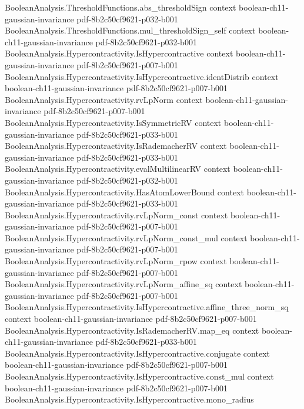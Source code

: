 \begin{theorem}
\proofstep
  {BooleanAnalysis.ThresholdFunctions.abs_thresholdSign}
  {context}
  {boolean-ch11-gaussian-invariance}
  {pdf-8b2c50cf9621-p032-b001}
\proofstep
  {BooleanAnalysis.ThresholdFunctions.mul_thresholdSign_self}
  {context}
  {boolean-ch11-gaussian-invariance}
  {pdf-8b2c50cf9621-p032-b001}
\proofstep
  {BooleanAnalysis.Hypercontractivity.IsHypercontractive}
  {context}
  {boolean-ch11-gaussian-invariance}
  {pdf-8b2c50cf9621-p007-b001}
\proofstep
  {BooleanAnalysis.Hypercontractivity.IsHypercontractive.identDistrib}
  {context}
  {boolean-ch11-gaussian-invariance}
  {pdf-8b2c50cf9621-p007-b001}
\proofstep
  {BooleanAnalysis.Hypercontractivity.rvLpNorm}
  {context}
  {boolean-ch11-gaussian-invariance}
  {pdf-8b2c50cf9621-p007-b001}
\proofstep
  {BooleanAnalysis.Hypercontractivity.IsSymmetricRV}
  {context}
  {boolean-ch11-gaussian-invariance}
  {pdf-8b2c50cf9621-p033-b001}
\proofstep
  {BooleanAnalysis.Hypercontractivity.IsRademacherRV}
  {context}
  {boolean-ch11-gaussian-invariance}
  {pdf-8b2c50cf9621-p033-b001}
\proofstep
  {BooleanAnalysis.Hypercontractivity.evalMultilinearRV}
  {context}
  {boolean-ch11-gaussian-invariance}
  {pdf-8b2c50cf9621-p032-b001}
\proofstep
  {BooleanAnalysis.Hypercontractivity.HasAtomLowerBound}
  {context}
  {boolean-ch11-gaussian-invariance}
  {pdf-8b2c50cf9621-p033-b001}
\proofstep
  {BooleanAnalysis.Hypercontractivity.rvLpNorm_const}
  {context}
  {boolean-ch11-gaussian-invariance}
  {pdf-8b2c50cf9621-p007-b001}
\proofstep
  {BooleanAnalysis.Hypercontractivity.rvLpNorm_const_mul}
  {context}
  {boolean-ch11-gaussian-invariance}
  {pdf-8b2c50cf9621-p007-b001}
\proofstep
  {BooleanAnalysis.Hypercontractivity.rvLpNorm_rpow}
  {context}
  {boolean-ch11-gaussian-invariance}
  {pdf-8b2c50cf9621-p007-b001}
\proofstep
  {BooleanAnalysis.Hypercontractivity.rvLpNorm_affine_sq}
  {context}
  {boolean-ch11-gaussian-invariance}
  {pdf-8b2c50cf9621-p007-b001}
\proofstep
  {BooleanAnalysis.Hypercontractivity.IsHypercontractive.affine_three_norm_sq}
  {context}
  {boolean-ch11-gaussian-invariance}
  {pdf-8b2c50cf9621-p007-b001}
\proofstep
  {BooleanAnalysis.Hypercontractivity.IsRademacherRV.map_eq}
  {context}
  {boolean-ch11-gaussian-invariance}
  {pdf-8b2c50cf9621-p033-b001}
\proofstep
  {BooleanAnalysis.Hypercontractivity.IsHypercontractive.conjugate}
  {context}
  {boolean-ch11-gaussian-invariance}
  {pdf-8b2c50cf9621-p007-b001}
\proofstep
  {BooleanAnalysis.Hypercontractivity.IsHypercontractive.const_mul}
  {context}
  {boolean-ch11-gaussian-invariance}
  {pdf-8b2c50cf9621-p007-b001}
\proofstep
  {BooleanAnalysis.Hypercontractivity.IsHypercontractive.mono_radius}

\end{theorem}
